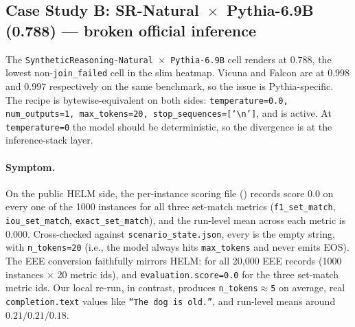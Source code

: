 \subsection{Case Study B: \texorpdfstring{SR-Natural~$\times$~Pythia-6.9B}{SR-Natural x Pythia-6.9B} (0.788) --- broken official inference}
\label{sec:app-helm-srnat-v2}

The \texttt{SyntheticReasoning-Natural~$\times$~Pythia-6.9B} cell
  renders at $0.788$, the lowest non-\texttt{join\_failed} cell in the
  slim heatmap.
Vicuna and Falcon are at $0.998$ and $0.997$ respectively on the same
  benchmark, so the issue is Pythia-specific.
The recipe is bytewise-equivalent on both sides:
  \texttt{temperature=0.0, num\_outputs=1, max\_tokens=20,
  stop\_sequences=[`\textbackslash n']}, and
   is active.
At \texttt{temperature=0} the model should be deterministic, so the
  divergence is at the inference-stack layer.

\paragraph{Symptom.}
On the public HELM side, the per-instance scoring file
  () records score $0.0$ on every
  one of the 1000 instances for all three set-match metrics
  (\texttt{f1\_set\_match}, \texttt{iou\_set\_match},
  \texttt{exact\_set\_match}), and the run-level mean across each
  metric is $0.000$.
Cross-checked against \texttt{scenario\_state.json}, every
   is the empty
  string, with \texttt{n\_tokens=20} (i.e., the model always hits
  \texttt{max\_tokens} and never emits EOS).
The EEE conversion faithfully mirrors HELM:
   for all 20{,}000
  EEE records (1000 instances $\times$ 20 metric ids), and
  \texttt{evaluation.score=0.0} for the three set-match metric ids.
Our local re-run, in contrast, produces \texttt{n\_tokens$\approx$5} on
  average, real \texttt{completion.text} values like
  \texttt{``The dog is old.''}, and run-level means around
  $0.21 / 0.21 / 0.18$.

